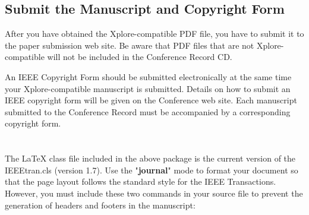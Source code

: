 \documentclass[journal]{IEEEtran}
\begin{document}

%


\subsection{Submit the Manuscript and Copyright Form}

After you have obtained the Xplore-compatible PDF file, you have to submit it to the paper submission web site. Be aware that PDF files that are not Xplore-compatible will not be included in the Conference Record CD.


An IEEE Copyright Form should be submitted electronically at the same time your Xplore-compatible manuscript is submitted. Details on how to submit an IEEE copyright form will be given on the Conference web site.  Each manuscript submitted to the Conference Record must be accompanied by a corresponding copyright form. 

\newpage


\appendices
\section{}

The {\LaTeX} class file included in the above package is the current version of the IEEEtran.cls (version 1.7).  Use the "{\bf journal}" mode to format your document so that the page layout follows the standard style for the IEEE Transactions. However, you must include these two commands in your source file to prevent the generation of headers and footers in the manuscript:
\end{document}
